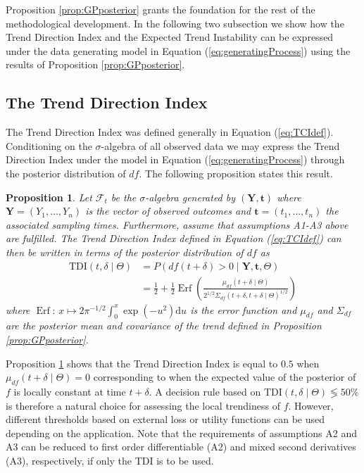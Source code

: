 \documentclass[11pt,]{article}
\DeclareMathOperator*{\Erf}{Erf}
\newtheorem{proposition}{Proposition}
\theoremstyle{nonumberplain}
\begin{document}
Proposition \ref{prop:GPposterior} grants the foundation for the rest of
the methodological development. In the following two subsection we show
how the Trend Direction Index and the Expected Trend Instability can be
expressed under the data generating model in Equation
(\ref{eq:generatingProcess}) using the results of Proposition
\ref{prop:GPposterior}.

\subsection{The Trend Direction Index}\label{the-trend-direction-index}

The Trend Direction Index was defined generally in Equation
(\ref{eq:TCIdef}). Conditioning on the \(\sigma\)-algebra of all
observed data we may express the Trend Direction Index under the model
in Equation (\ref{eq:generatingProcess}) through the posterior
distribution of \(df\). The following proposition states this result.

\vspace{0.2cm}

\begin{proposition}
Let $\mathcal{F}_t$ be the $\sigma$-algebra generated by $(\mathbf{Y}, \mathbf{t})$ where $\mathbf{Y} = (Y_1, \ldots, Y_n)$ is the vector of observed outcomes and $\mathbf{t} = (t_1, \ldots, t_n)$ the associated sampling times. Furthermore, assume that assumptions A1-A3 above are fulfilled. The Trend Direction Index defined in Equation (\ref{eq:TCIdef}) can then be written in terms of the posterior distribution of $df$ as
\begin{align*}
  \mathrm{TDI}(t, \delta \mid \Theta) &= P(df(t + \delta ) > 0 \mid \mathbf{Y}, \mathbf{t}, \Theta)\\
  &= \frac{1}{2} + \frac{1}{2}\Erf\left(\frac{\mu_{df}(t + \delta \mid \Theta)}{2^{1/2}\Sigma_{df}(t + \delta, t + \delta \mid \Theta)^{1/2}}\right)
\end{align*}
where $\Erf\colon\, x \mapsto 2\pi^{-1/2}\int_0^x \exp(-u^2)\mathrm{d}u$ is the error function and $\mu_{df}$ and $\Sigma_{df}$ are the posterior mean and covariance of the trend defined in Proposition \ref{prop:GPposterior}.
\label{prop:TDIposterior}
\end{proposition}

Proposition \ref{prop:TDIposterior} shows that the Trend Direction Index
is equal to \(0.5\) when \(\mu_{df}(t + \delta \mid \Theta) = 0\)
corresponding to when the expected value of the posterior of \(f\) is
locally constant at time \(t + \delta\). A decision rule based on
\(\mathrm{TDI}(t, \delta \mid \Theta) \lessgtr 50\%\) is therefore a
natural choice for assessing the local trendiness of \(f\). However,
different thresholds based on external loss or utility functions can be
used depending on the application. Note that the requirements of
assumptions A2 and A3 can be reduced to first order differentiable (A2)
and mixed second derivatives (A3), respectively, if only the TDI is to
be used.
\end{document}
